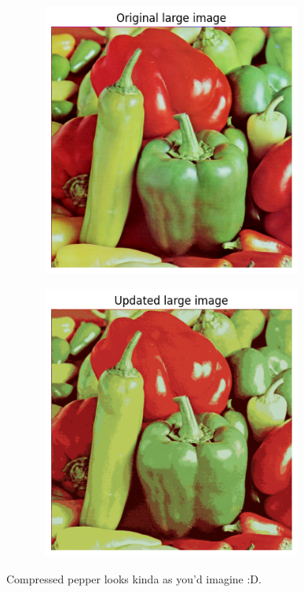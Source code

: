 %
%
\begin{answer}
\begin{figure}[H]
	\includegraphics[width=9cm,height=9cm,keepaspectratio]{../src/k_means/orig_large.png}
\end{figure}
\begin{figure}[H]
	\includegraphics[width=9cm,height=9cm,keepaspectratio]{../src/k_means/updated_large.png}
\end{figure}
Compressed pepper looks kinda as you'd imagine :D.
\end{answer}
%



